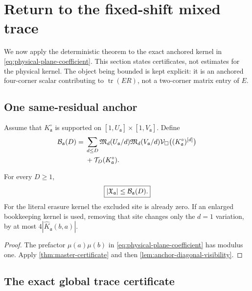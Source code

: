\section{Return to the fixed-shift mixed trace}
\label{sec:physical-gate}

We now apply the deterministic theorem to the exact anchored kernel in
\eqref{eq:physical-plane-coefficient}.  This section states certificates,
not estimates for the physical kernel.  The object being bounded is kept
explicit: it is an anchored four-corner scalar contributing to
\(\operatorname{tr}(ER)\), not a two-corner matrix entry of \(E\).

\subsection{One same-residual anchor}

Assume that \(K^\circ_{\mathfrak a}\) is supported on
\([1,U_{\mathfrak a}]\times[1,V_{\mathfrak a}]\).  Define
\begin{align}
 \mathcal B_{\mathfrak a}(D)
 ={}&
 \sum_{d\le D}
 \mathfrak M_d(U_{\mathfrak a}/d)
 \mathfrak M_d(V_{\mathfrak a}/d)
 \mathcal V_\square\bigl((K^\circ_{\mathfrak a})^{[d]}\bigr)
\notag\\
 &+\mathcal T_D(K^\circ_{\mathfrak a}).
\label{eq:physical-anchor-majorant}
\end{align}

\begin{proposition}
\label{prop:literal-anchor-certificate}
For every \(D\ge1\),
\begin{equation}
 \boxed{
 |\mathfrak X_{\mathfrak a}|
 \le
 \mathcal B_{\mathfrak a}(D).}
\label{eq:literal-anchor-certificate}
\end{equation}
For the literal erasure kernel the excluded site is already zero.  If an
enlarged bookkeeping kernel is used, removing that site changes only the
\(d=1\) variation, by at most
\(4|\widehat K_{\mathfrak a}(b,a)|\).
\end{proposition}

\begin{proof}
The prefactor \(\mu(a)\mu(b)\) in
\eqref{eq:physical-plane-coefficient} has modulus one.  Apply
\cref{thm:master-certificate} and then
\cref{lem:anchor-diagonal-visibility}.
\end{proof}

\subsection{The exact global trace certificate}


